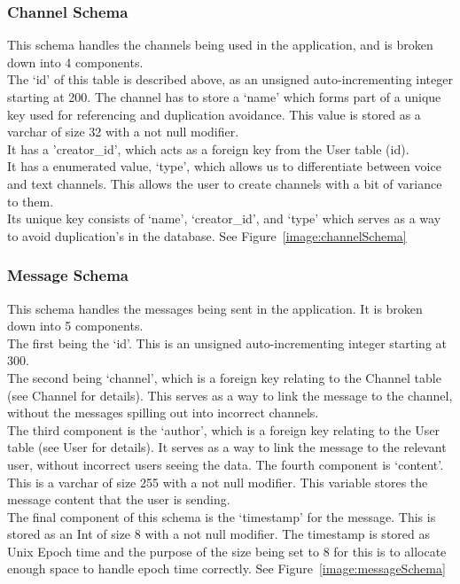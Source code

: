 \subsubsection{Channel Schema}
This schema handles the channels being used in the application, and is broken down into 4 components.
\\The ‘id’ of this table is described above, as an unsigned auto-incrementing integer starting at 200.
The channel has to store a ‘name’ which forms part of a unique key used for referencing and duplication avoidance. This value is stored as a varchar of size 32 with a not null modifier.
\\It has a 'creator\_id', which acts as a foreign key from the User table (id).
\\It has a enumerated value, ‘type’, which allows us to differentiate between voice and text channels. This allows the user to create channels with a bit of variance to them.
\\Its unique key consists of ‘name’, ‘creator\_id’, and ‘type’ which serves as a way to avoid duplication's in the database.
See Figure~\ref{image:channelSchema}

\subsubsection{Message Schema}
This schema handles the messages being sent in the application. It is broken down into 5 components.
\\The first being the ‘id’. This is an unsigned auto-incrementing integer starting at 300.
\\The second being ‘channel’, which is a foreign key relating to the Channel table (see Channel for details). This serves as a way to link the message to the channel, without the messages spilling out into incorrect channels.
\\The third component is the ‘author’, which is a foreign key relating to the User table (see User for details). It serves as a way to link the message to the relevant user, without incorrect users seeing the data.
The fourth component is ‘content’. This is a varchar of size 255 with a not null modifier. This variable stores the message content that the user is sending.
\\The final component of this schema is the ‘timestamp’ for the message. This is stored as an Int of size 8 with a not null modifier.  The timestamp is stored as Unix Epoch time and the purpose of the size being set to 8 for this is to allocate enough space to handle epoch time correctly.
See Figure~\ref{image:messageSchema}

